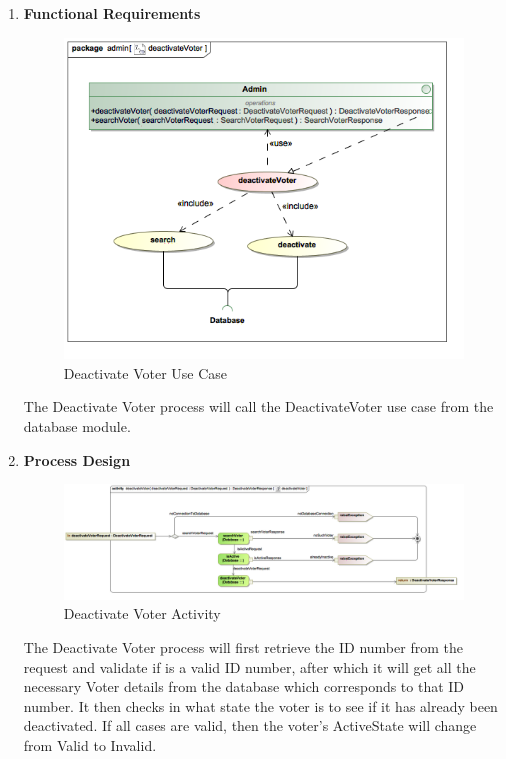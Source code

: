 \begin{enumerate}
\begin{enumerate}
			\newpage\textsl{}
			
			\item \textbf{Functional Requirements}
				\begin{figure}[H]
					\centering
					\includegraphics[width=0.75\linewidth]{../Images/Admin/UseCases/deactivateVoter_useCase.png}
					\caption{Deactivate Voter Use Case}
				\end{figure}
				
				The Deactivate Voter process will call the DeactivateVoter use case from the database module.
				\newline
				
			\item \textbf{Process Design}
				\begin{figure}[H]
					\centering
					\includegraphics[width=0.75\linewidth]{../Images/Admin/ActivityDiagrams/deactivateVoter_ActivityDiagram.png}
					\caption{Deactivate Voter Activity}
				\end{figure}
				
				The Deactivate Voter process will first retrieve the ID number from the request and validate if is a valid ID number, after which it will get all the necessary Voter details from the database which corresponds to that ID number. It then checks in what state the voter is to see if it has already been deactivated. If all cases are valid, then the voter's ActiveState will change from Valid to Invalid.
				\newline
				
		\end{enumerate}
		
		\newpage
\end{enumerate}